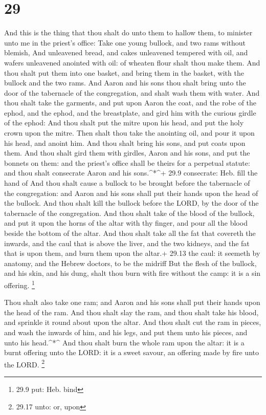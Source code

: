 \hypertarget{section-28}{%
\section{29}\label{section-28}}

 And this is the thing that thou shalt do unto them to
hallow them, to minister unto me in the priest's office: Take one young
bullock, and two rams without blemish,  And unleavened
bread, and cakes unleavened tempered with oil, and wafers unleavened
anointed with oil: of wheaten flour shalt thou make them. 
And thou shalt put them into one basket, and bring them in the basket,
with the bullock and the two rams.  And Aaron and his sons
thou shalt bring unto the door of the tabernacle of the congregation,
and shalt wash them with water.  And thou shalt take the
garments, and put upon Aaron the coat, and the robe of the ephod, and
the ephod, and the breastplate, and gird him with the curious girdle of
the ephod:  And thou shalt put the mitre upon his head, and
put the holy crown upon the mitre.  Then shalt thou take the
anointing oil, and pour it upon his head, and anoint him. 
And thou shalt bring his sons, and put coats upon them.  And
thou shalt gird them with girdles, Aaron and his sons, and put the
bonnets on them: and the priest's office shall be theirs for a perpetual
statute: and thou shalt consecrate Aaron and his sons.\^{}*\^{}+ 29.9
consecrate: Heb. fill the hand of  And thou shalt cause a
bullock to be brought before the tabernacle of the congregation: and
Aaron and his sons shall put their hands upon the head of the bullock.
 And thou shalt kill the bullock before the LORD, by the
door of the tabernacle of the congregation.  And thou shalt
take of the blood of the bullock, and put it upon the horns of the altar
with thy finger, and pour all the blood beside the bottom of the altar.
 And thou shalt take all the fat that covereth the inwards,
and the caul that is above the liver, and the two kidneys, and the fat
that is upon them, and burn them upon the altar.+ 29.13 the caul: it
seemeth by anatomy, and the Hebrew doctors, to be the midriff
 But the flesh of the bullock, and his skin, and his dung,
shalt thou burn with fire without the camp: it is a sin offering.
\footnote{29.9 put: Heb. bind}

 Thou shalt also take one ram; and Aaron and his sons shall
put their hands upon the head of the ram.  And thou shalt
slay the ram, and thou shalt take his blood, and sprinkle it round about
upon the altar.  And thou shalt cut the ram in pieces, and
wash the inwards of him, and his legs, and put them unto his pieces, and
unto his head.\^{}*\^{}  And thou shalt burn the whole ram
upon the altar: it is a burnt offering unto the LORD: it is a sweet
savour, an offering made by fire unto the LORD. \footnote{29.17 unto:
  or, upon}

